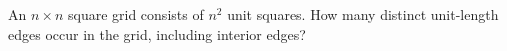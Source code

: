 An $n\times n$ square grid consists of $n^2$ unit squares. How many distinct unit-length edges occur in the grid, including interior edges?

